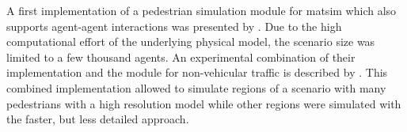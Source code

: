 A first implementation of a pedestrian simulation module for \gls{matsim} which also supports agent-agent interactions was presented by \citet{LaemmelPlaue_PED_2012}. Due to the high computational effort of the underlying physical model, the scenario size was limited to a few thousand agents. An experimental combination of their implementation and the module for non-vehicular traffic is described by \citet{DoblerLaemmel_PED_2012}. This combined implementation allowed to simulate regions of a scenario with many pedestrians with a high resolution model while other regions were simulated with the faster, but less detailed approach.

